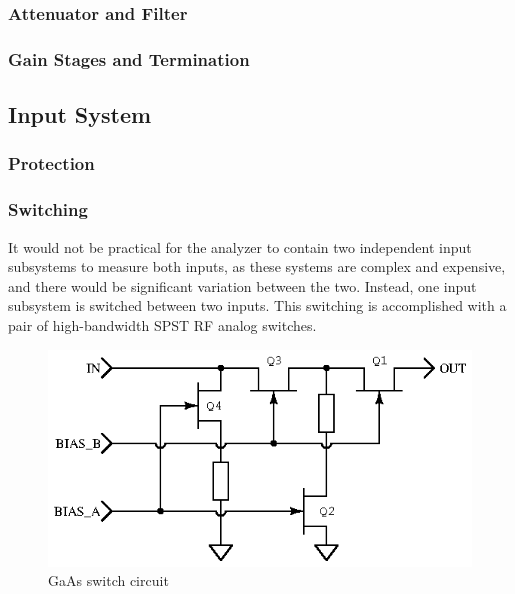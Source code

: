 \subsubsection{Attenuator and Filter}
\subsubsection{Gain Stages and Termination}

\subsection{Input System}

\subsubsection{Protection}

\subsubsection{Switching}


It would not be practical for the analyzer to contain two independent input
subsystems to measure both inputs, as these systems are complex and expensive,
and there would be significant variation between the two. Instead, one input
subsystem is switched between two inputs. This switching is accomplished with a
pair of high-bandwidth SPST RF analog switches.

\begin{figure}[H]
\centering
\includegraphics{gaassw}
\caption{GaAs switch circuit}
\label{fig:gaassw}
\end{figure}

